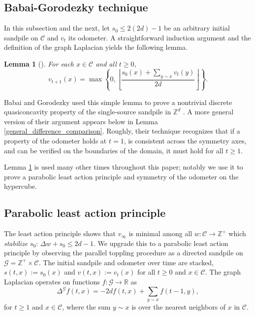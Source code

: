 \documentclass[12pt]{amsart}
\newtheorem{lemma}[theorem]{Lemma}
\newcommand{\Z}{\mathbb{Z}}
\begin{document}
	
	\subsection{Babai-Gorodezky technique} \label{subsec:babai_gorodezky} 
	In this subsection and the next, let $s_0 \leq 2 (2 d) - 1$ be an arbitrary initial sandpile on $\mathcal{C}$ and $v_t$ its odometer. A straightforward induction argument and the definition of the graph Laplacian yields the following lemma. 
	\begin{lemma}[] \label{pt_ind_lemma}
		For each $x \in \mathcal{C}$ and all $t \geq 0$, 
		\begin{equation}
		v_{t+1}(x) = \max\left\{0,\left\lfloor
        \frac{s_0(x)+\sum_{y\sim x}v_t(y)}{2d}\right\rfloor\right\}.
		\end{equation}
	\end{lemma}
	Babai and Gorodezky used this simple lemma to prove a nontrivial discrete quasiconcavity property of the single-source sandpile in $\Z^d$ \cite{babai2007sandpile}. A more general version of their argument appears below in Lemma \ref{general_difference_comparison}. Roughly, their technique recognizes that if a property of the odometer holds at $t=1$, is consistent across the symmetry axes, and can be verified on the boundaries of the domain, it must hold for all $t \geq 1$.
	
	Lemma \ref{pt_ind_lemma} is used many other times throughout this paper; notably we use it to prove a parabolic least action principle and symmetry of the odometer on the hypercube. 
	
	
	\subsection{Parabolic least action principle} \label{subsec:parabolic} 
	The least action principle \cite{fey2010growth} shows that $v_\infty$ is minimal among all $w: \mathcal{C} \to \mathbb{Z}^+$ which {\it stabilize} $s_0$: $\Delta w + s_0 \leq 2d -1$. We upgrade this to a parabolic least action principle by observing the parallel toppling procedure as a directed sandpile on $\mathcal{G} = \mathbb{Z}^+ \times \mathcal{C}$. The initial sandpile and odometer over time are stacked,
	$s(t,x) := s_0(x)$ and $v(t,x) := v_t(x)$ for all $t \geq 0$ and $x \in \mathcal{C}$.  The graph Laplacian operates on functions $f:\mathcal{G} \to \mathbb{R}$ as
	\begin{equation}
	\Delta^{\mathcal{G}} f(t,x) = -2 d f(t,x) + \sum_{y \sim x} f(t-1,y),
	\end{equation}
	for $t \geq 1$ and $x \in \mathcal{C}$, where the sum $y \sim x$ is over the nearest neighbors of $x$ in $\mathcal{C}$.
\end{document}
